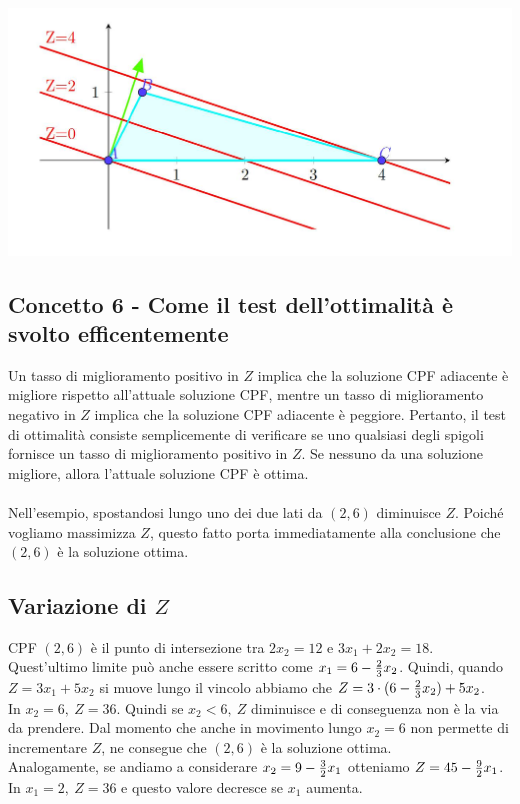 \documentclass[12pt,a4paper]{article}
\begin{document}
\begin{center}
\includegraphics[width=0.5\columnwidth]{img/concept5.jpg}
\end{center}

\subsection{Concetto 6 - Come il test dell'ottimalità è svolto efficentemente}
Un tasso di miglioramento positivo in $Z$ implica che la soluzione CPF adiacente è migliore rispetto all'attuale soluzione CPF, mentre un tasso di miglioramento negativo in $Z$ implica che la soluzione CPF adiacente è peggiore. Pertanto, il test di ottimalità consiste semplicemente di verificare se uno qualsiasi degli spigoli fornisce un tasso di miglioramento positivo in $Z$. Se nessuno da una soluzione migliore, allora l'attuale soluzione CPF è ottima.\\\\
Nell'esempio, spostandosi lungo uno dei due lati da $(2, 6)$ diminuisce $Z$. Poiché vogliamo massimizza $Z$, questo fatto porta immediatamente alla conclusione che $(2, 6)$ è la soluzione ottima.\\

\subsection{Variazione di $Z$}
CPF $(2,6)$ è il punto di intersezione  tra $2x_2 = 12$ e $3x_1+2x_2 = 18$. Quest'ultimo limite può anche essere scritto come $x_1=6-{2\over3}x_2$. Quindi, quando $Z=3x_1+5x_2$ si muove lungo il vincolo abbiamo che $Z=3\cdot (6-{2\over3}x_2) + 5x_2$.\\
In $x_2=6, \ Z=36$. Quindi se $x_2 < 6, \ Z$ diminuisce e di conseguenza non è la via da prendere. Dal momento che anche in movimento lungo $x_2=6$ non permette di incrementare $Z$, ne consegue che $(2,6)$ è la soluzione ottima.\\
Analogamente, se andiamo a considerare $x_2=9-{3\over2}x_1$ otteniamo $Z=45-{9\over 2}x_1$. In $x_1=2, \ Z=36$ e questo valore decresce se $x_1$ aumenta.\\
\end{document}
